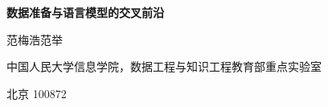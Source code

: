 \documentclass[UTF8,a4paper,zihao=-4,fontset=fandol]{ctexart}
\begin{document}
\thispagestyle{plain}
\begin{center}
{\fontsize{20pt}{27pt}\selectfont\bfseries 数据准备与语言模型的交叉前沿\par}
\vspace{11pt}
{\large 范梅浩\quad 范举\par}
\vspace{5pt}
{\small 中国人民大学信息学院，数据工程与知识工程教育部重点实验室\par
北京 100872\par}
\end{center}
\vspace{5pt}

\FloatBarrier
\clearpage
{\small
\setlength{\bibitemsep}{4pt}
\renewcommand{\bibfont}{\fontsize{9.5pt}{13.2pt}\selectfont}
\printbibliography[title={参考文献}]
}
\clearpage

\end{document}
